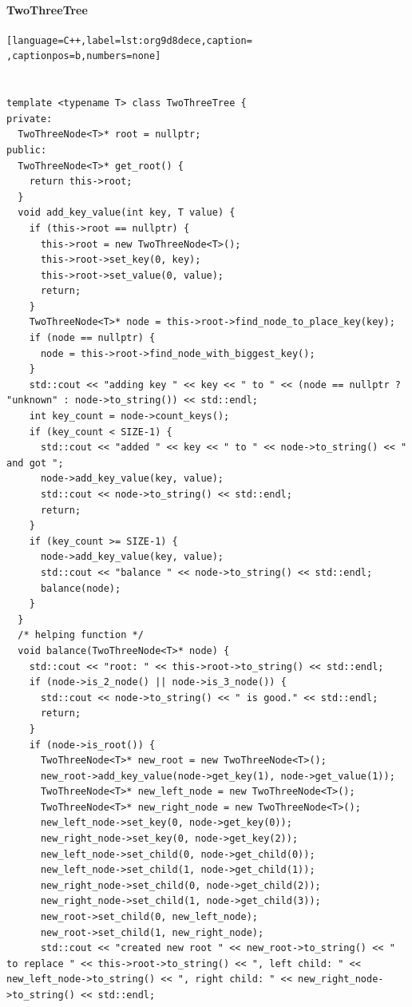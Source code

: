 \documentclass[a4paper,12pt]{article}
\begin{document}
\paragraph{TwoThreeTree}
\label{sec:org6f36a73}
\begin{lstlisting}[language=C++,label=lst:org9d8dece,caption= ,captionpos=b,numbers=none]


template <typename T> class TwoThreeTree {
private:
  TwoThreeNode<T>* root = nullptr;
public:
  TwoThreeNode<T>* get_root() {
    return this->root;
  }
  void add_key_value(int key, T value) {
    if (this->root == nullptr) {
      this->root = new TwoThreeNode<T>();
      this->root->set_key(0, key);
      this->root->set_value(0, value);
      return;
    }
    TwoThreeNode<T>* node = this->root->find_node_to_place_key(key);
    if (node == nullptr) {
      node = this->root->find_node_with_biggest_key();
    }
    std::cout << "adding key " << key << " to " << (node == nullptr ? "unknown" : node->to_string()) << std::endl;
    int key_count = node->count_keys();
    if (key_count < SIZE-1) {
      std::cout << "added " << key << " to " << node->to_string() << " and got ";
      node->add_key_value(key, value);
      std::cout << node->to_string() << std::endl;
      return;
    }
    if (key_count >= SIZE-1) {
      node->add_key_value(key, value);
      std::cout << "balance " << node->to_string() << std::endl;
      balance(node);
    }
  }
  /* helping function */
  void balance(TwoThreeNode<T>* node) {
    std::cout << "root: " << this->root->to_string() << std::endl;
    if (node->is_2_node() || node->is_3_node()) {
      std::cout << node->to_string() << " is good." << std::endl;
      return;
    }
    if (node->is_root()) {
      TwoThreeNode<T>* new_root = new TwoThreeNode<T>();
      new_root->add_key_value(node->get_key(1), node->get_value(1));
      TwoThreeNode<T>* new_left_node = new TwoThreeNode<T>();
      TwoThreeNode<T>* new_right_node = new TwoThreeNode<T>();
      new_left_node->set_key(0, node->get_key(0));
      new_right_node->set_key(0, node->get_key(2));
      new_left_node->set_child(0, node->get_child(0));
      new_left_node->set_child(1, node->get_child(1));
      new_right_node->set_child(0, node->get_child(2));
      new_right_node->set_child(1, node->get_child(3));
      new_root->set_child(0, new_left_node);
      new_root->set_child(1, new_right_node);
      std::cout << "created new root " << new_root->to_string() << " to replace " << this->root->to_string() << ", left child: " << new_left_node->to_string() << ", right child: " << new_right_node->to_string() << std::endl;

\end{lstlisting}
\end{document}
